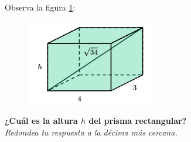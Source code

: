 \question[15]  Observa la figura \ref{fig:pitagoras3D_diag_05}:
\begin{figure}[H]
    \begin{center}
        \includegraphics[width=0.5\textwidth]{../images/pitagoras3D_diag_05.png}
    \end{center}
    \caption{}
    \label{fig:pitagoras3D_diag_05}
\end{figure}
\textbf{¿Cuál es la altura $h$ del prisma rectangular?}\\
\textit{Redondea tu respuesta a la décima más cercana.}